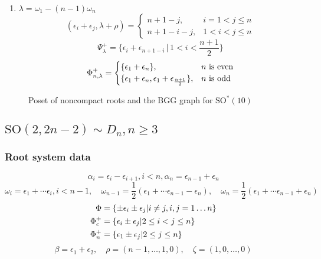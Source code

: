 \begin{enumerate}
 \item $\lambda = \omega_1 -(n-1)\omega_n $\\
 \[
  (\epsilon_i + \epsilon_j,\lambda+\rho) = \begin{cases}
                                            n+1-j, & i=1<j\leq n\\
                                            n+1-i-j, & 1<i<j\leq n
                                           \end{cases}
 \]
 \[
   \Psi^+_\lambda = \Big\{\epsilon_i + \epsilon_{n+1-i} \,\big|\, 1 < i < \frac{n+1}{2} \Big\}
 \]
 \[
   \Phi^+_{n,\lambda} = \begin{cases}
				\{\epsilon_1 + \epsilon_n \}, & n \text{ is even} \\
				\{\epsilon_1 + \epsilon_n, \epsilon_1 + \epsilon_{\frac{n+1}{2}} \}, & n \text{ is odd}
			  \end{cases}
  \]
\end{enumerate}

\begin{figure}[h]
  \centering
   
	 
  \caption{Poset of noncompact roots and the BGG graph for $\mathrm{SO}^*(10)$}
\end{figure} 

\clearpage

\subsection[SO(2,2n-2)]{$\mathrm{SO}(2,2n-2) \sim D_n, n\geq 3$}

\subsubsection{Root system data}

\[\alpha_i = \epsilon_i - \epsilon_{i+1}, i<n, \alpha_n = \epsilon_{n-1} + \epsilon_n\]
\[\omega_i = \epsilon_1+\cdots \epsilon_i, i < n-1, \quad \omega_{n-1} = \frac{1}{2}(\epsilon_1 + \cdots \epsilon_{n-1}-\epsilon_n), \quad \omega_{n} = \frac{1}{2}(\epsilon_1 + \cdots \epsilon_{n-1}+\epsilon_n)\]
\begin{align*}
 \Phi &= \{ \pm \epsilon_i \pm \epsilon_j | i\neq j, i,j = 1\ldots n \} \\
 \Phi_c^+ &= \{ \epsilon_i\pm \epsilon_j | 2\leq i < j \leq  n\}\\
 \Phi_n^+ &= \{ \epsilon_1 \pm \epsilon_j | 2 \leq  j \leq n \}
 \end{align*}
\[\beta = \epsilon_1+\epsilon_2,\quad \rho = (n-1,\ldots ,1,0),\quad \zeta = (1,0,\ldots,0)\]

